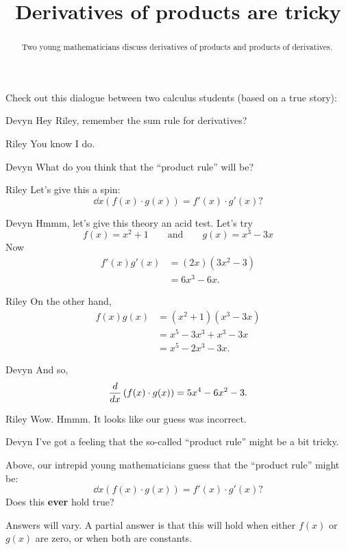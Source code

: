 \documentclass{ximera}
\title[Break-Ground:]{Derivatives of products are tricky}
\begin{document}
\begin{abstract}
Two young mathematicians discuss derivatives of products and products
of derivatives.
\end{abstract}
\maketitle

Check out this dialogue between two calculus students (based on a true
story):

\begin{dialogue}
\item[Devyn] Hey Riley, remember the sum rule for derivatives?
\item[Riley] You know I do.
\item[Devyn] What do you think that the ``product rule'' will be?
\item[Riley] Let's give this a spin:
  \[
  \dd{x} \left(f(x)\cdot g(x)\right) = f'(x) \cdot g'(x)?
  \]
\item[Devyn] Hmmm, let's give this theory an acid test. Let's try
  \[
  f(x) = x^2+1\qquad\text{and}\qquad g(x) = x^3-3x
  \]
  Now
  \begin{align*}
    f'(x)g'(x) &= (2x)(3x^2-3)\\
    &= 6x^3-6x.
  \end{align*}
\item[Riley] On the other hand,
  \begin{align*}
    f(x)g(x) &= (x^2+1)(x^3-3x)\\
    &=x^5-3x^3+x^3-3x\\
    &=x^5-2x^3-3x.
  \end{align*} 
\item[Devyn] And so, 
  \[
  \frac{d}{\mathop{}\!d x} \left(f(x) \cdot g(x)\right) = 5x^4-6x^2-3.
  \]
\item[Riley] Wow. Hmmm. It looks like our guess was incorrect.
\item[Devyn] I've got a feeling that the so-called ``product rule''
  might be a bit tricky.
\end{dialogue}

\begin{problem}
  Above, our intrepid young mathematicians guess that the ``product rule'' might be:
  \[
  \dd{x} \left(f(x)\cdot g(x)\right) = f'(x) \cdot g'(x)?
  \]
  Does this \textbf{ever} hold true?
  \begin{freeResponse}
    Answers will vary. A partial answer is that this will hold when
    either $f(x)$ or $g(x)$ are zero, or when both are constants.
  \end{freeResponse}
\end{problem}



%
\end{document}
